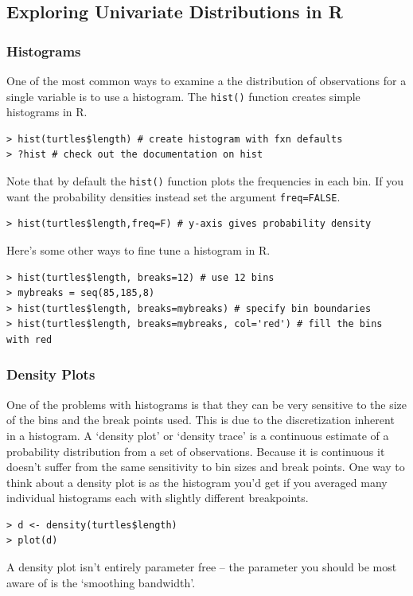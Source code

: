 \documentclass{article}
\begin{document}
\subsection{Exploring Univariate Distributions in R}

\subsubsection{Histograms}

One of the most common ways to examine a the distribution of
observations for a single variable is to use a histogram. The
\lstinline!hist()! function creates simple histograms in R.

\begin{lstlisting}
> hist(turtles$length) # create histogram with fxn defaults
> ?hist # check out the documentation on hist
\end{lstlisting}
Note that by default the \lstinline!hist()! function plots the
frequencies in each bin. If you want the probability densities instead
set the argument \lstinline!freq=FALSE!.

\begin{lstlisting}
> hist(turtles$length,freq=F) # y-axis gives probability density
\end{lstlisting}
Here's some other ways to fine tune a histogram in R.

\begin{lstlisting}
> hist(turtles$length, breaks=12) # use 12 bins
> mybreaks = seq(85,185,8)
> hist(turtles$length, breaks=mybreaks) # specify bin boundaries   
> hist(turtles$length, breaks=mybreaks, col='red') # fill the bins with red  
\end{lstlisting}
\subsubsection{Density Plots}

One of the problems with histograms is that they can be very sensitive
to the size of the bins and the break points used. This is due to the
discretization inherent in a histogram. A `density plot' or `density
trace' is a continuous estimate of a probability distribution from a set
of observations. Because it is continuous it doesn't suffer from the
same sensitivity to bin sizes and break points. One way to think about a
density plot is as the histogram you'd get if you averaged many
individual histograms each with slightly different breakpoints.

\begin{lstlisting}
> d <- density(turtles$length)
> plot(d)    
\end{lstlisting}
A density plot isn't entirely parameter free -- the parameter you should
be most aware of is the `smoothing bandwidth'.
\end{document}
